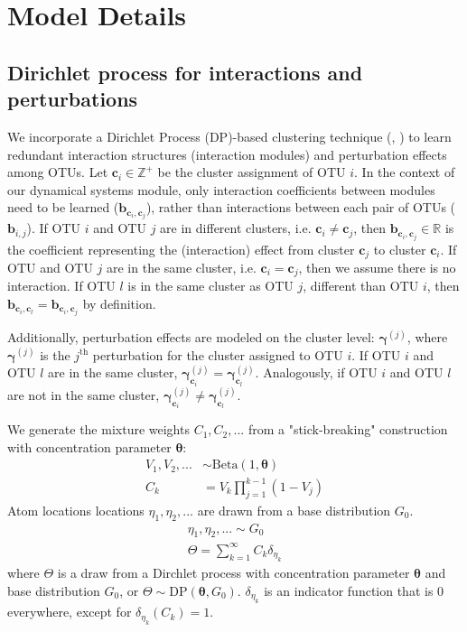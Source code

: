 \documentclass{article}
\newcommand{\Betadist}{\text{Beta}}
\newcommand{\DPdist}{\text{DP}}
\newcommand{\ci}[1]{\mathbf{c}_{#1}}
\newcommand{\concc}{\mathbf{\theta}}
\newcommand{\interact}{\mathbf{b}}
\newcommand{\interactij}[2]{\interact_{#1, #2}}
\newcommand{\interactcij}[2]{\interact_{\ci{#1}, \ci{#2}}}
\newcommand{\perti}[1]{\mathbf{\gamma}^{(#1)}} %
\newcommand{\pertic}[2]{\mathbf{\gamma}^{(#1)}_{\ci{#2}}} %
\newcommand{\reals}{\mathbb{R}} %
\newcommand{\ints}{\mathbb{Z}} %
\begin{document}
\section{Model Details}
\subsection{Dirichlet process for interactions and perturbations}
\label{subsection:dirichlet process}
We incorporate a Dirichlet Process (DP)-based clustering technique (\cite{cite:neal2000}, \cite{cite:ramussen2000}) to learn redundant interaction structures (interaction modules) and perturbation effects among OTUs. Let $\ci{i} \in \ints^+$ be the cluster assignment of OTU $i$. In the context of our dynamical systems module, only interaction coefficients between modules need to be learned ($\interactcij{i}{j}$), rather than interactions between each pair of OTUs ($\interactij{i}{j}$). If OTU $i$ and OTU $j$ are in different clusters, i.e. $\ci{i} \neq \ci{j}$, then $\interactcij{i}{j} \in \reals$ is the coefficient representing the (interaction) effect from cluster $\ci{j}$ to cluster $\ci{i}$. If OTU  and OTU $j$ are in the same cluster, i.e. $\ci{i} = \ci{j}$, then we assume there is no interaction. If OTU $l$ is in the same cluster as OTU $j$, different than OTU $i$, then $\interactcij{i}{l} = \interactcij{i}{j}$ by definition.

Additionally, perturbation effects are modeled on the cluster level: $\perti{j}$, where $\perti{j}$ is the $j^{\text{th}}$ perturbation for the cluster assigned to OTU $i$. If OTU $i$ and OTU $l$ are in the same cluster, $\pertic{j}{i} = \pertic{j}{l}$. Analogously, if OTU $i$ and OTU $l$ are not in the same cluster, $\pertic{j}{i} \neq \pertic{j}{l}$.

We generate the mixture weights $C_1, C_2,...$ from a "stick-breaking" construction with concentration parameter $\concc$:
\begin{align}
    V_1, V_2, ... & \sim \Betadist (1,\concc) \\
    C_k & = V_k \prod_{j=1}^{k-1}(1-V_j)
\end{align}
Atom locations locations $\eta_{1}, \eta_{2}, ...$ are drawn from a base distribution $G_0$.
\begin{align}
    \eta_1, \eta_2,... \sim G_0 \\
    \Theta = \sum_{k=1}^{\infty}C_k \delta_{\eta_k}
\end{align}
where $\Theta$ is a draw from a Dirchlet process with concentration parameter $\concc$ and base distribution $G_0$, or $\Theta \sim \DPdist(\concc, G_0)$. $\delta_{\eta_k}$ is an indicator function that is 0 everywhere, except for $\delta_{\eta_k}(C_k)=1$.
\end{document}
